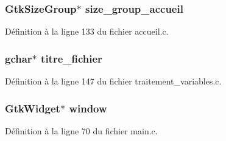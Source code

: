 \subsubsection[{size\_\-group\_\-accueil}]{\setlength{\rightskip}{0pt plus 5cm}GtkSizeGroup$\ast$ {\bf size\_\-group\_\-accueil}}\label{accueil_8c_a7a2c9fe3145d035ff2611ca3f3d06bca}


Définition à la ligne 133 du fichier accueil.c.

\subsubsection[{titre\_\-fichier}]{\setlength{\rightskip}{0pt plus 5cm}gchar$\ast$ {\bf titre\_\-fichier}}\label{accueil_8c_a787cc81cf2ad728775b73d723713980b}


Définition à la ligne 147 du fichier traitement\_\-variables.c.

\subsubsection[{window}]{\setlength{\rightskip}{0pt plus 5cm}GtkWidget$\ast$ {\bf window}}\label{accueil_8c_a3d346c08cf2d67c388caabffb412b293}


Définition à la ligne 70 du fichier main.c.

